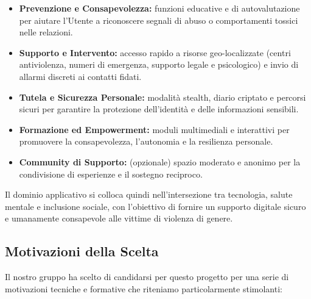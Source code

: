\documentclass[a4paper,12pt]{article}
\begin{document}
\begin{itemize}
\item \textbf{Prevenzione e Consapevolezza:} funzioni educative e di autovalutazione per aiutare l’Utente a riconoscere segnali di abuso o comportamenti tossici nelle relazioni.
\item \textbf{Supporto e Intervento:} accesso rapido a risorse geo-localizzate (centri antiviolenza, numeri di emergenza, supporto legale e psicologico) e invio di allarmi discreti ai contatti fidati.
\item \textbf{Tutela e Sicurezza Personale:} modalità stealth, diario criptato e percorsi sicuri per garantire la protezione dell’identità e delle informazioni sensibili.
\item \textbf{Formazione ed Empowerment:} moduli multimediali e interattivi per promuovere la consapevolezza, l’autonomia e la resilienza personale.
\item \textbf{Community di Supporto:} (opzionale) spazio moderato e anonimo per la condivisione di esperienze e il sostegno reciproco.
\end{itemize}

Il dominio applicativo si colloca quindi nell’intersezione tra tecnologia, salute mentale e inclusione sociale, con l’obiettivo di fornire un supporto digitale sicuro e umanamente consapevole alle vittime di violenza di genere.

\subsection{Motivazioni della Scelta}
Il nostro gruppo ha scelto di candidarsi per questo progetto per una serie di motivazioni tecniche e formative che riteniamo particolarmente stimolanti:
\end{document}
